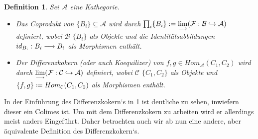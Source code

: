 \documentclass[10pt,a4paper]{report}
\newcounter{Aussage}[chapter]
\newtheorem{definition}[Aussage]{Definition}
\newcommand{\functionfront}[3]{\nolinebreak{#1:#2 \longrightarrow #3}}
\newcommand{\colimes}[0]{\lim\limits_{ \longrightarrow }}
\newcommand{\infunctionfront}[3]{\nolinebreak{#1:#2 \hookrightarrow #3}}
\newcommand*{\defeq}{\mathrel{\vcenter{\baselineskip0.5ex \lineskiplimit0pt
                     \hbox{\scriptsize.}\hbox{\scriptsize.}}}%
                     =}
\begin{document}
\begin{definition} \label{altDifferenzkoerndef}
Sei $\mathcal{A}$ eine Kathegorie.
\begin{itemize}
\item Das Coprodukt von $ \lbrace B_i \rbrace \subseteq \mathcal{A}$ wird durch $\prod_i \lbrace B_i \rbrace := \colimes(\infunctionfront{\mathcal{F}}{\mathcal{B}}{\mathcal{A}})$ definiert, 
wobei $\mathcal{B}$ $\lbrace B_i \rbrace$ als Objekte und die Identitätsabbildungen $\functionfront{id_{B_i}}{B_i}{B_i}$ als Morphismen enthält.
\item Der Differenzkokern (oder auch Koequilizer) von $f,g \in Hom_{\mathcal{A}}(C_1,C_2)$ wird durch $\colimes(\infunctionfront{\mathcal{F}}{\mathcal{C}}{\mathcal{A}})$ definiert,
wobei $\mathcal{C}$ $\lbrace C_1,C_2 \rbrace$ als Objekte und $ \lbrace f,g \rbrace \defeq Hom_{\mathcal{C}}(C_1,C_2)$ als Morphismen enthält.
\end{itemize}
\end{definition}

In der Einführung des Differenzkokern`s in \cref{altDifferenzkoerndef} ist deutliche zu sehen, inwiefern dieser ein Colimes ist. Um mit dem Differenzkokern zu arbeiten wird er allerdings meist anders Eingeführt. Daher betrachten auch wir ab nun eine andere, aber äquivalente Definition des Differenzkokern`s.
\end{document}
